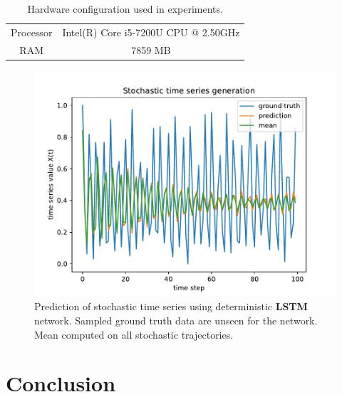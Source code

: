 \documentclass{article}
\begin{document}
\begin{table}
    \centering
    \begin{tabular}{cc}
        Processor & Intel(R) Core i5-7200U CPU @ 2.50GHz \\
        RAM       & 7859 MB                              \\
    \end{tabular}
    \caption{Hardware configuration used in experiments.}
    \label{tab:hardware}
\end{table}

\begin{figure}
    \centering
    \includegraphics[width=\textwidth]{figures/nn_limitation.pdf}
    \caption{Prediction of stochastic time series using deterministic
        \textbf{LSTM} network. Sampled ground truth data are unseen for the network.
        Mean computed on all stochastic trajectories.}
    \label{fig:nn_limitation}
\end{figure}

\section{Conclusion}
\end{document}
